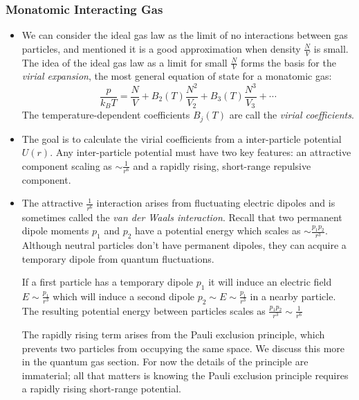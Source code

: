 \documentclass[11pt, a4paper]{article}
\begin{document}
\subsubsection{Monatomic Interacting Gas}
\begin{itemize}
	\item We can consider the ideal gas law as the limit of no interactions between gas particles, and mentioned it is a good approximation when density $ \frac{N}{V} $ is small. The idea of the ideal gas law as a limit for small $ \frac{N}{V} $ forms the basis for the \textit{virial expansion}, the most general equation of state for a monatomic gas:
	\begin{equation*}
		\frac{p}{k_{B}T} = \frac{N}{V} + B_{2}(T) \frac{N^{2}}{V_{2}} + B_{3}(T) \frac{N^{3}}{V_{3}} + \cdots
	\end{equation*}
	The temperature-dependent coefficients $ B_{j}(T) $ are call the \textit{virial coefficients}.
	
	\item The goal is to calculate the virial coefficients from a inter-particle potential $ U(r) $. Any inter-particle potential must have two key features: an attractive component scaling as $ \sim \frac{1}{r^{6}} $ and a rapidly rising, short-range repulsive component.
	
	\item The attractive $ \frac{1}{r^{6}} $ interaction arises from fluctuating electric dipoles and is sometimes called the \textit{van der Waals interaction}. Recall that two permanent dipole moments $ p_{1} $ and $ p_{2} $ have a potential energy which scales as $ \sim \frac{p_{1}p_{2}}{r^{3}} $. Although neutral particles don't have permanent dipoles, they can acquire a temporary dipole from quantum fluctuations. 
	
	If a first particle has a temporary dipole $ p_{1} $ it will induce an electric field $ E \sim \frac{p_{1}}{r^{3}} $ which will induce a second dipole $ p_{2} \sim E \sim \frac{p_{1}}{r^{3}} $ in a nearby particle. The resulting potential energy between particles scales as $ \frac{p_{1}p_{2}}{r^{3}} \sim \frac{1}{r^{6}}$
	
	The rapidly rising term arises from the Pauli exclusion principle, which prevents two particles from occupying the same space. We discuss this more in the quantum gas section. For now the details of the principle are immaterial; all that matters is knowing the Pauli exclusion principle requires a rapidly rising short-range potential.
	

\end{itemize}
\end{document}
